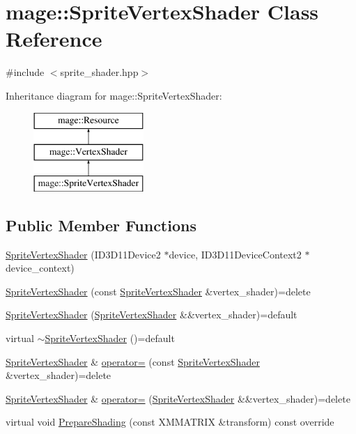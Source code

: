 \hypertarget{classmage_1_1_sprite_vertex_shader}{}\section{mage\+:\+:Sprite\+Vertex\+Shader Class Reference}
\label{classmage_1_1_sprite_vertex_shader}


{\ttfamily \#include $<$sprite\+\_\+shader.\+hpp$>$}

Inheritance diagram for mage\+:\+:Sprite\+Vertex\+Shader\+:\begin{figure}[H]
\begin{center}
\leavevmode
\includegraphics[height=3.000000cm]{classmage_1_1_sprite_vertex_shader}
\end{center}
\end{figure}
\subsection*{Public Member Functions}
\begin{DoxyCompactItemize}
\item 
\hyperlink{classmage_1_1_sprite_vertex_shader_a57f08ac16ace6190281fb4fa413c1b9e}{Sprite\+Vertex\+Shader} (I\+D3\+D11\+Device2 $\ast$device, I\+D3\+D11\+Device\+Context2 $\ast$device\+\_\+context)
\item 
\hyperlink{classmage_1_1_sprite_vertex_shader_a00f902a89cc3f9c9ce3d5b526eece29c}{Sprite\+Vertex\+Shader} (const \hyperlink{classmage_1_1_sprite_vertex_shader}{Sprite\+Vertex\+Shader} \&vertex\+\_\+shader)=delete
\item 
\hyperlink{classmage_1_1_sprite_vertex_shader_afb8c1866f6ffdb0fdcd1017591b8c832}{Sprite\+Vertex\+Shader} (\hyperlink{classmage_1_1_sprite_vertex_shader}{Sprite\+Vertex\+Shader} \&\&vertex\+\_\+shader)=default
\item 
virtual \hyperlink{classmage_1_1_sprite_vertex_shader_a8bed9663e8aac773ed31c58ca6e0d98f}{$\sim$\+Sprite\+Vertex\+Shader} ()=default
\item 
\hyperlink{classmage_1_1_sprite_vertex_shader}{Sprite\+Vertex\+Shader} \& \hyperlink{classmage_1_1_sprite_vertex_shader_a4400ddda9637b280b7c8aedeeec6e4e7}{operator=} (const \hyperlink{classmage_1_1_sprite_vertex_shader}{Sprite\+Vertex\+Shader} \&vertex\+\_\+shader)=delete
\item 
\hyperlink{classmage_1_1_sprite_vertex_shader}{Sprite\+Vertex\+Shader} \& \hyperlink{classmage_1_1_sprite_vertex_shader_aac64cf5df2b118ba95be72aef2bd3dca}{operator=} (\hyperlink{classmage_1_1_sprite_vertex_shader}{Sprite\+Vertex\+Shader} \&\&vertex\+\_\+shader)=delete
\item 
virtual void \hyperlink{classmage_1_1_sprite_vertex_shader_a6daf06fe73ed40cc7b71e474070144fc}{Prepare\+Shading} (const X\+M\+M\+A\+T\+R\+IX \&transform) const override
\end{DoxyCompactItemize}
